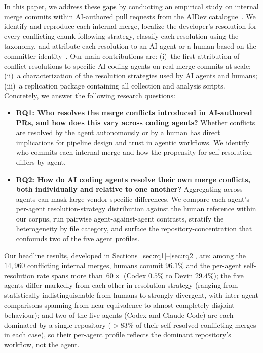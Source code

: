 \documentclass[sigconf,anonymous]{acmart}
\begin{document}
In this paper, we address these gaps by conducting an empirical study on internal merge commits within AI-authored pull requests from the AIDev catalogue~\cite{liaidev2026}. We identify and reproduce each internal merge, localize the developer's resolution for every conflicting chunk following \citet{dinella2022deepmerge} strategy, classify each resolution using the \citet{ghiotto2020nature} taxonomy, and attribute each resolution to an AI agent or a human based on the committer identity~\cite{liaidev2025se3}. Our main contributions are: (i)~the first attribution of conflict resolutions to specific AI coding agents on real merge commits at scale; (ii)~a characterization of the resolution strategies used by AI agents and humans; (iii)~a replication package containing all collection and analysis scripts. Concretely, we answer the following research questions:

\begin{itemize}
    \item \textbf{RQ1: Who resolves the merge conflicts introduced in AI-authored PRs, and how does this vary across coding agents?} Whether conflicts are resolved by the agent autonomously or by a human has direct implications for pipeline design and trust in agentic workflows. We identify who commits each internal merge and how the propensity for self-resolution differs by agent.
    \item \textbf{RQ2: How do AI coding agents resolve their own merge conflicts, both individually and relative to one another?} Aggregating across agents can mask large vendor-specific differences. We compare each agent's per-agent resolution-strategy distribution against the human reference within our corpus, run pairwise agent-against-agent contrasts, stratify the heterogeneity by file category, and surface the repository-concentration that confounds two of the five agent profiles.
\end{itemize}

Our headline results, developed in Sections~\ref{sec:rq1}--\ref{sec:rq2}, are: among the $14{,}960$ conflicting internal merges, humans commit $96.1\%$ and the per-agent self-resolution rate spans more than~$60{\times}$ (Codex $0.5\%$ to Devin $29.4\%$); the five agents differ markedly from each other in resolution strategy (ranging from statistically indistinguishable from humans to strongly divergent, with inter-agent comparisons spanning from near equivalence to almost completely disjoint behaviour); and two of the five agents (Codex and Claude Code) are each dominated by a single repository ($>83\%$ of their self-resolved conflicting merges in each case), so their per-agent profile reflects the dominant repository's workflow, not the agent.
\end{document}
